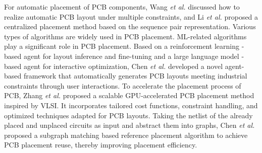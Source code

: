 For automatic placement of PCB components, Wang \emph{et al.}\cite{10652855} discussed how to realize automatic PCB layout under multiple constraints, and Li \emph{et al.}\cite{10652825} proposed a centralized placement method based on the sequence pair representation.
Various types of algorithms are widely used in PCB placement. ML-related algorithms play a significant role in PCB placement.  Based on a reinforcement learning -based agent for layout inference and
fine-tuning and a large language model -based agent for interactive optimization, Chen \emph{et al.}\cite{Chen2025} developed a novel agent-based framework that automatically generates PCB layouts meeting industrial constraints
through user interactions. To accelerate the placement process of PCB, Zhang \emph{et al.} \cite{zhang2025cypress} proposed a scalable GPU-accelerated PCB placement method inspired by VLSI. It incorporates
tailored cost functions, constraint handling, and optimized techniques adapted for PCB layouts. Taking the netlist of the already placed and unplaced circuits as input and abstract them into graphs, Chen \emph{et al.} \cite{10617495} proposed a subgraph matching based reference placement algorithm to achieve PCB placement reuse, thereby improving placement efficiency.




